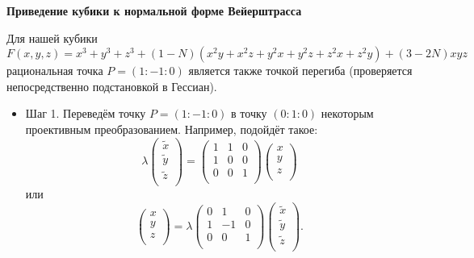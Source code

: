 \documentclass[a4paper,12pt]{article}
\theoremstyle{definition}
\begin{document}
    \begin{center}
        \textbf{Приведение кубики к нормальной форме Вейерштрасса}
    \end{center}

    Для нашей кубики 
    \[
    F(x, y, z) = x^3 + y^3 + z^3 + (1 - N) (x^2 y + x^2 z + y^2 x + y^2 z + z^2 x + z^2 y) +
    (3 - 2 N) x y z 
    \] 
    рациональная точка \(P = (1 : -1 : 0)\) является также точкой перегиба
    (проверяется непосредственно подстановкой в Гессиан).

    \begin{itemize}[leftmargin=0.6cm]
        \item Шаг 1. Переведём точку \(P = (1 : -1 : 0)\) в точку
        \((0 : 1 : 0)\) некоторым проективным преобразованием. Например,
        подойдёт такое:
        \[
        \lambda
        \begin{pmatrix}
            \widetilde{x} \\
            \widetilde{y} \\
            \widetilde{z} \\
        \end{pmatrix} 
        = 
        \begin{pmatrix}
            1 & 1 & 0 \\
            1 & 0 & 0 \\
            0 & 0 & 1 \\
        \end{pmatrix}
        \begin{pmatrix}
            x \\
            y \\
            z \\
        \end{pmatrix}
        \]
        или
        \[
        \begin{pmatrix}
            x \\
            y \\
            z \\
        \end{pmatrix} =
        \lambda
        \begin{pmatrix}
            0 & 1 & 0 \\
            1 & -1 & 0 \\
            0 & 0 & 1 \\
        \end{pmatrix}
        \begin{pmatrix}
            \widetilde{x} \\
            \widetilde{y} \\
            \widetilde{z} \\
        \end{pmatrix} 
        .\] 
        


\end{itemize}
\end{document}
